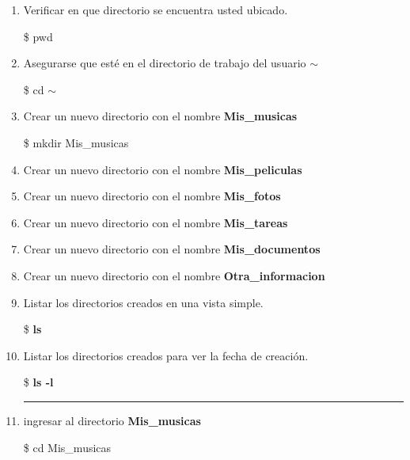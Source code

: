 \documentclass[a4paper,12pt,spanish]{article}
\begin{document}
\begin{enumerate}
  \item Verificar en que directorio se encuentra usted ubicado.
  \begin{tcolorbox}[colback=gray!5]
   \$ pwd
  \end{tcolorbox}
  \item Asegurarse que esté en el directorio de trabajo del  usuario  {\Large $\sim$} 
  \begin{tcolorbox}[colback=gray!5]
   \$ cd $\sim$
 \end{tcolorbox}
 \begin{shadedbox}
   \textcolor{white}{{\large {}}}
   \end{shadedbox}

 


  \item Crear un nuevo directorio con el nombre \textbf{Mis\_musicas}
  \begin{tcolorbox}[colback=red!5!white,colframe=red!75!black,fonttitle=\bfseries]
    \$ mkdir Mis\_musicas
  \end{tcolorbox}
  \item Crear un nuevo directorio con el nombre \textbf{Mis\_peliculas}
  \item Crear un nuevo directorio con el nombre \textbf{Mis\_fotos}
  \item Crear un nuevo directorio con el nombre \textbf{Mis\_tareas}
  \item Crear un nuevo directorio con el nombre \textbf{Mis\_documentos}
  \item Crear un nuevo directorio con el nombre \textbf{Otra\_informacion}
  
  \item Listar los directorios creados en una vista simple.
  \begin{tcolorbox}[colback=red!5!white,colframe=red!75!black,fonttitle=\bfseries]

    \$ \textbf{ls}
  \end{tcolorbox}
  \item Listar los directorios creados para ver la fecha de creación.
  \begin{tcolorbox}[colback=red!5!white,colframe=red!75!black,fonttitle=\bfseries]
    \$ \textbf{ls -l}
  \end{tcolorbox}
  \rule{4cm}{0.4pt}
 \item ingresar al directorio \textbf{Mis\_musicas}
  \begin{tcolorbox}[colback=red!5!white,colframe=red!75!black,fonttitle=\bfseries]
    \$ cd Mis\_musicas
  \end{tcolorbox}
 

\end{enumerate}
\end{document}
